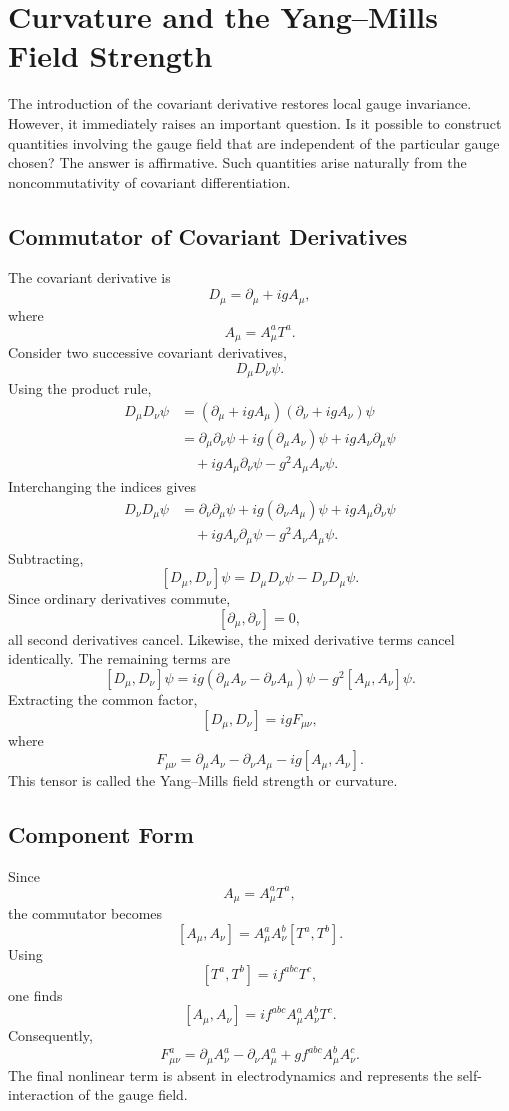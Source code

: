 \section{Curvature and the Yang--Mills Field Strength}
The introduction of the covariant derivative restores local gauge
invariance. However, it immediately raises an important question.
Is it possible to construct quantities involving the gauge field that
are independent of the particular gauge chosen?
The answer is affirmative. Such quantities arise naturally from the
noncommutativity of covariant differentiation.
\subsection{Commutator of Covariant Derivatives}
The covariant derivative is
\[D_\mu=\partial_\mu+igA_\mu,\]
where
\[A_\mu=A_\mu^aT^a.\]
Consider two successive covariant derivatives,
\[D_\mu D_\nu\psi.\]
Using the product rule,
\[\begin{aligned}
D_\mu D_\nu\psi&=(\partial_\mu+igA_\mu)(\partial_\nu+igA_\nu)\psi\\
&=\partial_\mu\partial_\nu\psi+ig(\partial_\mu A_\nu)\psi+igA_\nu\partial_\mu\psi\\
&\quad+igA_\mu\partial_\nu\psi-g^2A_\mu A_\nu\psi.
\end{aligned}\]
Interchanging the indices gives
\[\begin{aligned}
D_\nu D_\mu\psi&=\partial_\nu\partial_\mu\psi
    +ig(\partial_\nu A_\mu)\psi+igA_\mu\partial_\nu\psi\\
&\quad+igA_\nu\partial_\mu\psi-g^2A_\nu A_\mu\psi.
\end{aligned}\]
Subtracting,
\[[D_\mu,D_\nu]\psi=D_\mu D_\nu\psi-D_\nu D_\mu\psi.\]
Since ordinary derivatives commute,
\[[\partial_\mu,\partial_\nu]=0,\]
all second derivatives cancel.
Likewise,
the mixed derivative terms cancel identically.
The remaining terms are
\[[D_\mu,D_\nu]\psi=ig(\partial_\mu A_\nu-\partial_\nu A_\mu)\psi
-g^2[A_\mu,A_\nu]\psi.\]
Extracting the common factor,
\[\boxed{[D_\mu,D_\nu]=igF_{\mu\nu},}\]
where
\[\boxed{F_{\mu\nu}=\partial_\mu A_\nu-\partial_\nu A_\mu-ig[A_\mu,A_\nu].}\]
This tensor is called the Yang--Mills field strength or curvature.
\subsection{Component Form}
Since
\[A_\mu=A_\mu^aT^a,\]
the commutator becomes
\[[A_\mu,A_\nu]=A_\mu^aA_\nu^b[T^a,T^b].\]
Using
\[[T^a,T^b]=if^{abc}T^c,\]
one finds
\[[A_\mu,A_\nu]=if^{abc}A_\mu^aA_\nu^b T^c.\]
Consequently,
\[\boxed{F_{\mu\nu}^a=\partial_\mu A_\nu^a-
\partial_\nu A_\mu^a+gf^{abc}A_\mu^bA_\nu^c.}\]
The final nonlinear term is absent in electrodynamics and represents the
self-interaction of the gauge field.
